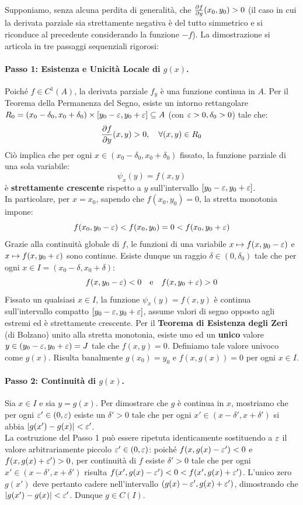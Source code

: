 \begin{dimostrazione}
Supponiamo, senza alcuna perdita di generalità, che $\frac{\partial f}{\partial y}(x_0, y_0) > 0$ (il caso in cui la derivata parziale sia strettamente negativa è del tutto simmetrico e si riconduce al precedente considerando la funzione $-f$).
La dimostrazione si articola in tre passaggi sequenziali rigorosi:

\paragraph{Passo 1: Esistenza e Unicità Locale di $g(x)$.}
Poiché $f \in C^1(A)$, la derivata parziale $f_y$ è una funzione continua in $A$. Per il Teorema della Permanenza del Segno, esiste un intorno rettangolare $R_0 = (x_0-\delta_0, x_0+\delta_0) \times [y_0-\varepsilon, y_0+\varepsilon] \subseteq A$ (con $\varepsilon > 0, \delta_0 > 0$) tale che:
\[
\frac{\partial f}{\partial y}(x, y) > 0, \quad \forall (x, y) \in R_0
\]
Ciò implica che per ogni $x \in (x_0-\delta_0, x_0+\delta_0)$ fissato, la funzione parziale di una sola variabile:
\[
\psi_x(y) = f(x, y)
\]
è \textbf{strettamente crescente} rispetto a $y$ sull'intervallo $[y_0 - \varepsilon, y_0 + \varepsilon]$.\\
In particolare, per $x = x_0$, sapendo che $f(x_0, y_0) = 0$, la stretta monotonia impone:
\[
f(x_0, y_0 - \varepsilon) < f(x_0, y_0) = 0 < f(x_0, y_0 + \varepsilon)
\]
Grazie alla continuità globale di $f$, le funzioni di una variabile $x \mapsto f(x, y_0 - \varepsilon)$ e $x \mapsto f(x, y_0 + \varepsilon)$ sono continue. Esiste dunque un raggio $\delta \in (0, \delta_0)$ tale che per ogni $x \in I = (x_0 - \delta, x_0 + \delta)$:
\[
f(x, y_0 - \varepsilon) < 0 \quad \text{e} \quad f(x, y_0 + \varepsilon) > 0
\]
Fissato un qualsiasi $x \in I$, la funzione $\psi_x(y) = f(x,y)$ è continua sull'intervallo compatto $[y_0-\varepsilon, y_0+\varepsilon]$, assume valori di segno opposto agli estremi ed è strettamente crescente. Per il \textbf{Teorema di Esistenza degli Zeri} (di Bolzano) unito alla stretta monotonia, esiste uno ed un \textbf{unico} valore $y \in (y_0 - \varepsilon, y_0 + \varepsilon) = J$ tale che $f(x, y) = 0$.
Definiamo tale valore univoco come $g(x)$. Risulta banalmente $g(x_0) = y_0$ e $f(x, g(x)) = 0$ per ogni $x \in I$.

\paragraph{Passo 2: Continuità di $g(x)$.}
Sia $x \in I$ e sia $y = g(x)$. Per dimostrare che $g$ è continua in $x$, mostriamo che per ogni $\varepsilon' \in (0, \varepsilon)$ esiste un $\delta' > 0$ tale che per ogni $x' \in (x - \delta', x + \delta')$ si abbia $\lvert g(x') - g(x)\rvert < \varepsilon'$.\\
La costruzione del Passo 1 può essere ripetuta identicamente sostituendo a $\varepsilon$ il valore arbitrariamente piccolo $\varepsilon' \in (0, \varepsilon)$: poiché $f(x, g(x) - \varepsilon') < 0$ e $f(x, g(x) + \varepsilon') > 0$, per continuità di $f$ esiste $\delta' > 0$ tale che per ogni $x' \in (x - \delta', x + \delta')$ risulta $f(x', g(x) - \varepsilon') < 0 < f(x', g(x) + \varepsilon')$. L'unico zero $g(x')$ deve pertanto cadere nell'intervallo $(g(x) - \varepsilon', g(x) + \varepsilon')$, dimostrando che $\lvert g(x') - g(x)\rvert < \varepsilon'$. Dunque $g \in C(I)$.


\end{dimostrazione}
